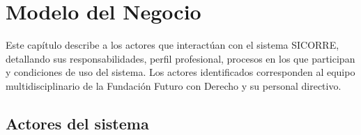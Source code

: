
\chapter{Modelo del Negocio}	
\label{cap:reqSist}


Este capítulo describe a los actores que interactúan con el sistema SICORRE, detallando 
sus responsabilidades, perfil profesional, procesos en los que participan y condiciones 
de uso del sistema. Los actores identificados corresponden al equipo multidisciplinario 
de la Fundación Futuro con Derecho y su personal directivo.

\hypertarget{Actor.Usuario}{}
\section{Actores del sistema}

